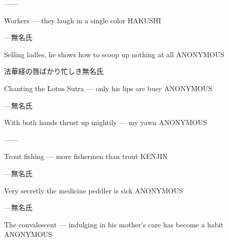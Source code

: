 \begin{haiku}
    ---\hfill{---}

    \vin{} Workers ---
    \vin{} \vin{} they laugh
    \vin{} \vin{} \vin{} in a single color \hspace{\fill} HAKUSHI
\end{haiku}

\begin{haiku}
    {---}\hfill{\FH 無名氏}

    \vin{} Selling ladles,
    \vin{} \vin{} he shows how to scoop up
    \vin{} \vin{} \vin{} nothing at all \hspace{\fill} ANONYMOUS
\end{haiku}

\begin{haiku}
    {法華経の唇ばかり忙しき}\hfill{\FH 無名氏}

    \vin{} Chanting the Lotus Sutra ---
    \vin{} \vin{} only his lips
    \vin{} \vin{} \vin{} are busy \hspace{\fill} ANONYMOUS
\end{haiku}

\begin{haiku}
    {---}\hfill{\FH 無名氏}

    \vin{} With both hands
    \vin{} \vin{} thrust up mightily ---
    \vin{} \vin{} \vin{} my yawn \hspace{\fill} ANONYMOUS
\end{haiku}

\begin{haiku}
    ---\hfill{---}

    \vin{} Trout fishing ---
    \vin{} \vin{} more fishermen
    \vin{} \vin{} \vin{} than trout \hspace{\fill} KENJIN
\end{haiku}

\begin{haiku}
    {---}\hfill{\FH 無名氏}

    \vin{} Very secretly
    \vin{} \vin{} the medicine peddler
    \vin{} \vin{} \vin{} is sick \hspace{\fill} ANONYMOUS
\end{haiku}

\begin{haiku}
    {---}\hfill{\FH 無名氏}

    \vin{} The convalescent ---
    \vin{} \vin{} indulging in his mother's care
    \vin{} \vin{} \vin{} has become a habit \hspace{\fill} ANONYMOUS
\end{haiku}

